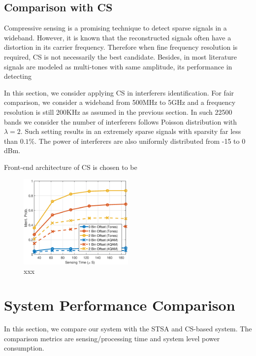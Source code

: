 \documentclass{IEEEtran}
\begin{document}
\subsection{Comparison with CS}
Compressive sensing is a promising technique to detect sparse signals in a wideband. However, it is known that the reconstructed signals often have a distortion in its carrier frequency. Therefore when fine frequency resolution is required, CS is not necessarily the best candidate. Besides, in most literature signals are modeled as multi-tones with same amplitude, its performance in detecting 

In this section, we consider applying CS in interferers identification. For fair comparison, we consider a wideband from 500MHz to 5GHz and a frequency resolution is still 200KHz as assumed in the previous section. In such 22500 bands we consider the number of interferers follows Poisson distribution with $\lambda = 2$. Such setting results in an extremely sparse signals with sparsity far less than $0.1\%$. The power of interferers are also uniformly distributed from -15 to 0 dBm. 

Front-end architecture of CS is chosen to be 

\begin{figure}
\begin{center}
\includegraphics[width=0.5\textwidth]{figure/cs_v2}
\end{center}
\caption{xxx}
\label{fig:sim_vs_theo1}
\end{figure}

%
%
\section{System Performance Comparison}
In this section, we compare our system with the STSA and CS-based system. The comparison metrics are sensing/processing time and system level power consumption.
\end{document}
